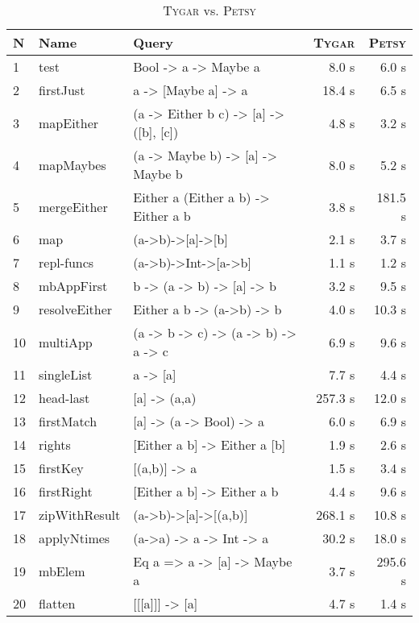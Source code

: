 \begin{table*}
\tiny
\caption{\textsc{Tygar} vs. \textsc{Petsy}}
\label{tab:results}
\begin{tabular}{|l |l l| r | r |}
\hline
N & Name & Query   &  \textsc{Tygar}	& \textsc{Petsy} \\ 
\hline
1 & test & Bool -> a -> Maybe a & 8.0 s & 6.0 s \\ 
2 & firstJust & a -> [Maybe a] -> a & 18.4 s & 6.5 s \\ 
3 & mapEither & (a -> Either b c) -> [a] -> ([b], [c]) & 4.8 s & 3.2 s \\ 
4 & mapMaybes & (a -> Maybe b) -> [a] -> Maybe b & 8.0 s & 5.2 s \\ 
5 & mergeEither & Either a (Either a b) -> Either a b & 3.8 s & 181.5 s \\ 
6 & map & (a->b)->[a]->[b] & 2.1 s & 3.7 s \\ 
7 & repl-funcs & (a->b)->Int->[a->b] & 1.1 s & 1.2 s \\ 
8 & mbAppFirst & b -> (a -> b) -> [a] -> b & 3.2 s & 9.5 s \\ 
9 & resolveEither & Either a b -> (a->b) -> b & 4.0 s & 10.3 s \\ 
10 & multiApp & (a -> b -> c) -> (a -> b) -> a -> c & 6.9 s & 9.6 s \\ 
11 & singleList & a -> [a] & 7.7 s & 4.4 s \\ 
12 & head-last & [a] -> (a,a) & 257.3 s & 12.0 s \\ 
13 & firstMatch & [a] -> (a -> Bool) -> a & 6.0 s & 6.9 s \\ 
14 & rights & [Either a b] -> Either a [b] & 1.9 s & 2.6 s \\ 
15 & firstKey & [(a,b)] -> a & 1.5 s & 3.4 s \\ 
16 & firstRight & [Either a b] -> Either a b & 4.4 s & 9.6 s \\ 
17 & zipWithResult & (a->b)->[a]->[(a,b)] & 268.1 s & 10.8 s \\ 
18 & applyNtimes & (a->a) -> a -> Int -> a & 30.2 s & 18.0 s \\ 
19 & mbElem & Eq a => a -> [a] -> Maybe a & 3.7 s & 295.6 s \\ 
20 & flatten & [[[a]]] -> [a] & 4.7 s & 1.4 s \\ 
\hline
\end{tabular}
\end{table*}

